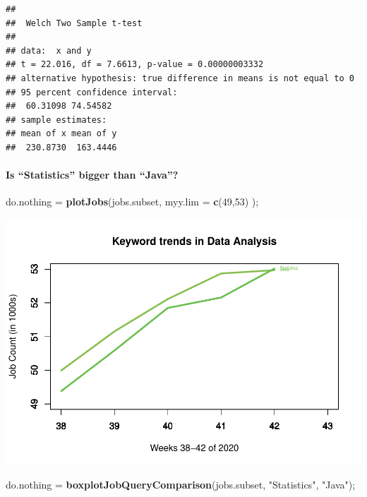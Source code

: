 \documentclass[
]{article}
\newenvironment{Shaded}{\begin{snugshade}}{\end{snugshade}}
\newcommand{\DataTypeTok}[1]{\textcolor[rgb]{0.13,0.29,0.53}{#1}}
\newcommand{\DecValTok}[1]{\textcolor[rgb]{0.00,0.00,0.81}{#1}}
\newcommand{\KeywordTok}[1]{\textcolor[rgb]{0.13,0.29,0.53}{\textbf{#1}}}
\newcommand{\NormalTok}[1]{#1}
\newcommand{\StringTok}[1]{\textcolor[rgb]{0.31,0.60,0.02}{#1}}
\begin{document}
\begin{verbatim}
## 
##  Welch Two Sample t-test
## 
## data:  x and y
## t = 22.016, df = 7.6613, p-value = 0.00000003332
## alternative hypothesis: true difference in means is not equal to 0
## 95 percent confidence interval:
##  60.31098 74.54582
## sample estimates:
## mean of x mean of y 
##  230.8730  163.4446
\end{verbatim}

\hypertarget{is-statistics-bigger-than-java}{%
\paragraph{Is ``Statistics'' bigger than
``Java''?}\label{is-statistics-bigger-than-java}}

\begin{Shaded}
\begin{Highlighting}[]
\NormalTok{do.nothing =}\StringTok{ }\KeywordTok{plotJobs}\NormalTok{(jobs.subset, }\DataTypeTok{myy.lim =} \KeywordTok{c}\NormalTok{(}\DecValTok{49}\NormalTok{,}\DecValTok{53}\NormalTok{) );}
\end{Highlighting}
\end{Shaded}

\includegraphics{graphics/chunk-plotting-jobs-trends-statistics-1.pdf}

\begin{Shaded}
\begin{Highlighting}[]
\NormalTok{do.nothing =}\StringTok{ }\KeywordTok{boxplotJobQueryComparison}\NormalTok{(jobs.subset, }\StringTok{"Statistics"}\NormalTok{, }\StringTok{"Java"}\NormalTok{);}
\end{Highlighting}
\end{Shaded}
\end{document}
